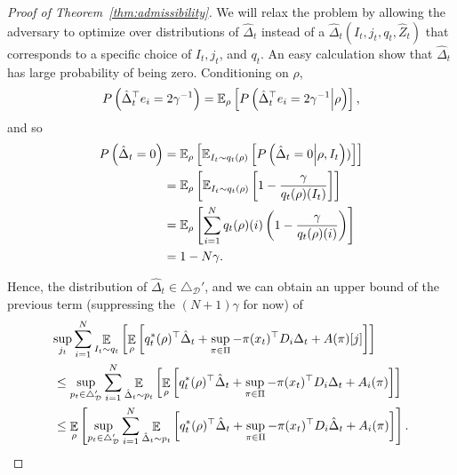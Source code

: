 \documentclass[11pt]{article}
\begin{document}
\begin{proof}[Proof of Theorem~\ref{thm:admissibility}]
We will relax the problem by allowing the adversary to optimize over distributions of $\hat\Delta_t$ instead of a $\hat\Delta_t(I_t,j_t,q_t,\hat Z_t)$ that corresponds to a specific choice of $I_t,j_t$, and $q_t$. An easy calculation show that $\hat\Delta_t$ has large probability of being zero. Conditioning on $\rho$,
\begin{align*}
  P\left(\hat\Delta_t^\top e_i = 2\gamma^{-1}\right)
  =
  \mathbb E_\rho\left[P\left(\hat\Delta_t^\top e_i = 2\gamma^{-1}\middle | \rho \right) \right],
\end{align*}
and so
\begin{align*}
  P\left(\hat\Delta_t = 0 \right)
  &=
  \mathbb E_{\rho}\left[ \mathbb E_{I_t \sim q_t(\rho)}\left[ P\left(\hat\Delta_t =0 \middle |\rho, I_t\right))\right]\right]\\
  &=
    \mathbb E_{\rho}\left[ \mathbb E_{I_t \sim q_t(\rho)}\left[
    1-\frac{\gamma}{q_t(\rho)(I_t)}
    \right]\right]\\
  &= \mathbb E_{\rho}\left[
    \sum_{i=1}^N q_t(\rho)(i) \left(1- \frac{\gamma}{q_t(\rho)(i)}\right)\right]\\
  &= 1 - N \gamma.
\end{align*}

Hence, the distribution of $\hat\Delta_t \in \triangle_{\mathcal D}'$, and we can obtain an upper bound of the previous term (suppressing the $(N+1)\gamma$ for now) of 
\begin{align*}
  &\lefteqn{
        \sup_{j_t } \sum_{i=1}^N\mathop{\ex}_{I_t\sim q_t}\left[\mathop{\ex}_{\rho}\left[ q_t^*(\rho)^\top \hat \Delta_t
    +
    \sup_{\pi\in\Pi} -\pi(x_t)^\top D_i\Delta_t + A(\pi)[j]\right]\right]
    }\\
  &\leq
    \sup_{p_t\in\triangle_{\mathcal D}'}\sum_{i=1}^N \mathop{\ex}_{\hat\Delta_t\sim p_t}\left[\mathop{\ex}_{\rho}\left[ q_t^*(\rho)^\top \hat \Delta_t
    +
    \sup_{\pi\in\Pi} -\pi(x_t)^\top D_i\Delta_t + A_i(\pi)\right]\right]\\
    &\leq
\mathop{\ex}_{\rho}\left[ \sup_{p_t\in\triangle_{\mathcal D}'}\sum_{i=1}^N \mathop{\ex}_{\hat\Delta_t\sim p_t}\left[ q_t^*(\rho)^\top \hat \Delta_t
    +
  \sup_{\pi\in\Pi} -\pi(x_t)^\top D_i\hat\Delta_t + A_i(\pi)\right]\right].
\end{align*}


\end{proof}
\end{document}

